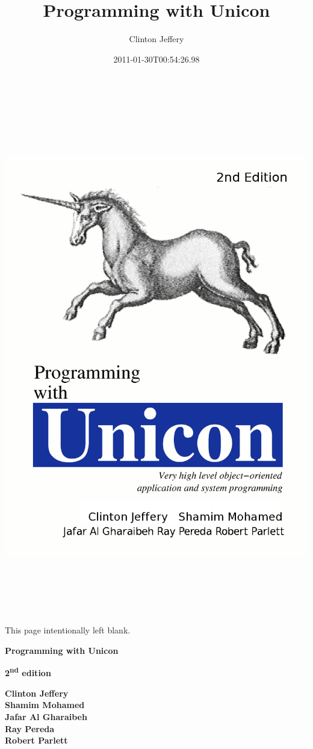\documentclass[letterpaper,twoside,12pt]{book}
\title{Programming with Unicon}
\author{Clinton Jeffery}
\date{2011-01-30T00:54:26.98}
\begin{document}
\thispagestyle{empty}
\setlength{\topmargin}{-0.05in}
\hspace{-1.0in}
\includegraphics[width=7.2in,height=8.9in]{ub-img/ub-img1.png}
\clearpage

\bigskip
This page intentionally left blank.
\clearpage

\vspace*{3\bigskipamount}
\begin{center}
  \bfseries\Huge
  Programming with Unicon
\end{center}
\bigskip
\bigskip
\begin{center}
  \bfseries\huge
  2\textsuperscript{nd} edition
\end{center}
\vspace*{7\bigskipamount}
\begin{flushright}\bfseries
Clinton Jeffery \\
Shamim Mohamed \\
Jafar Al Gharaibeh \\
Ray Pereda \\
Robert Parlett 
\end{flushright}
\clearpage
\end{document}
